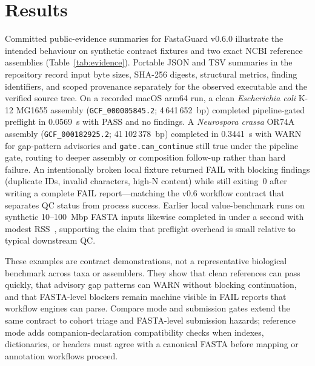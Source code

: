 \documentclass[11pt,a4paper]{article}
\begin{document}
\section{Results}
Committed public-evidence summaries for FastaGuard v0.6.0 illustrate the intended
behaviour on synthetic contract fixtures and two exact NCBI reference assemblies
(Table~\ref{tab:evidence}).
Portable JSON and TSV summaries in the repository record input byte sizes,
SHA-256 digests, structural metrics, finding identifiers, and scoped provenance
separately for the observed executable and the verified source tree.
On a recorded macOS arm64 run, a clean \emph{Escherichia coli} K-12 MG1655
assembly (\texttt{GCF\_000005845.2}; 4\,641\,652~bp) completed pipeline-gated
preflight in 0.0569~s with PASS and no findings.
A \emph{Neurospora crassa} OR74A assembly (\texttt{GCF\_000182925.2}; 41\,102\,378~bp)
completed in 0.3441~s with WARN for gap-pattern advisories and
\texttt{gate.can\_continue} still true under the pipeline gate, routing to deeper
assembly or composition follow-up rather than hard failure.
An intentionally broken local fixture returned FAIL with blocking findings
(duplicate IDs, invalid characters, high-N content) while still exiting~0 after
writing a complete FAIL report---matching the v0.6 workflow contract that
separates QC status from process success.
Earlier local value-benchmark runs on synthetic 10--100~Mbp FASTA inputs
likewise completed in under a second with modest RSS~\citep{fastaguard2026},
supporting the claim that preflight overhead is small relative to typical
downstream QC.

These examples are contract demonstrations, not a representative biological
benchmark across taxa or assemblers.
They show that clean references can pass quickly, that advisory gap patterns can
WARN without blocking continuation, and that FASTA-level blockers remain machine
visible in FAIL reports that workflow engines can parse.
Compare mode and submission gates extend the same contract to cohort triage and
FASTA-level submission hazards; reference mode adds companion-declaration
compatibility checks when indexes, dictionaries, or headers must agree with a
canonical FASTA before mapping or annotation workflows proceed.
\end{document}

